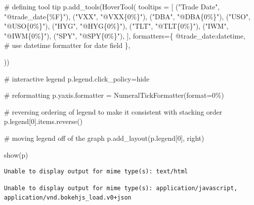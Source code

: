 \documentclass[
  letterpaper,
  DIV=11,
  numbers=noendperiod]{scrreprt}
\newenvironment{Shaded}{\begin{snugshade}}{\end{snugshade}}
\newcommand{\BuiltInTok}[1]{\textcolor[rgb]{0.00,0.23,0.31}{#1}}
\newcommand{\CommentTok}[1]{\textcolor[rgb]{0.37,0.37,0.37}{#1}}
\newcommand{\DecValTok}[1]{\textcolor[rgb]{0.68,0.00,0.00}{#1}}
\newcommand{\NormalTok}[1]{\textcolor[rgb]{0.00,0.23,0.31}{#1}}
\newcommand{\OperatorTok}[1]{\textcolor[rgb]{0.37,0.37,0.37}{#1}}
\newcommand{\SpecialCharTok}[1]{\textcolor[rgb]{0.37,0.37,0.37}{#1}}
\newcommand{\StringTok}[1]{\textcolor[rgb]{0.13,0.47,0.30}{#1}}
\begin{document}
\begin{Shaded}
\begin{Highlighting}[]
\CommentTok{\# defining tool tip}
\NormalTok{p.add\_tools(HoverTool(}
\NormalTok{    tooltips }\OperatorTok{=}\NormalTok{ [}
\NormalTok{        (}\StringTok{"Trade Date"}\NormalTok{, }\StringTok{"@trade\_date\{}\SpecialCharTok{\%F}\StringTok{\}"}\NormalTok{),}
\NormalTok{        (}\StringTok{"VXX"}\NormalTok{, }\StringTok{"@VXX\{0\%\}"}\NormalTok{),}
\NormalTok{        (}\StringTok{"DBA"}\NormalTok{, }\StringTok{"@DBA\{0\%\}"}\NormalTok{),}
\NormalTok{        (}\StringTok{"USO"}\NormalTok{, }\StringTok{"@USO\{0\%\}"}\NormalTok{),}
\NormalTok{        (}\StringTok{"HYG"}\NormalTok{, }\StringTok{"@HYG\{0\%\}"}\NormalTok{),}
\NormalTok{        (}\StringTok{"TLT"}\NormalTok{, }\StringTok{"@TLT\{0\%\}"}\NormalTok{),}
\NormalTok{        (}\StringTok{"IWM"}\NormalTok{, }\StringTok{"@IWM\{0\%\}"}\NormalTok{),}
\NormalTok{        (}\StringTok{"SPY"}\NormalTok{, }\StringTok{"@SPY\{0\%\}"}\NormalTok{),}
\NormalTok{    ],}
\NormalTok{    formatters}\OperatorTok{=}\NormalTok{\{}
        \StringTok{\textquotesingle{}@trade\_date\textquotesingle{}}\NormalTok{:}\StringTok{\textquotesingle{}datetime\textquotesingle{}}\NormalTok{, }\CommentTok{\# use \textquotesingle{}datetime\textquotesingle{} formatter for \textquotesingle{}date\textquotesingle{} field}
\NormalTok{    \},}

\NormalTok{))}

\CommentTok{\# interactive legend}
\NormalTok{p.legend.click\_policy}\OperatorTok{=}\StringTok{\textquotesingle{}hide\textquotesingle{}}

\CommentTok{\# reformatting }
\NormalTok{p.yaxis.formatter }\OperatorTok{=}\NormalTok{ NumeralTickFormatter(}\BuiltInTok{format}\OperatorTok{=}\StringTok{\textquotesingle{}0\%\textquotesingle{}}\NormalTok{)}

\CommentTok{\# reversing ordering of legend to make it consistent with stacking order}
\NormalTok{p.legend[}\DecValTok{0}\NormalTok{].items.reverse()}

\CommentTok{\# moving legend off of the graph}
\NormalTok{p.add\_layout(p.legend[}\DecValTok{0}\NormalTok{], }\StringTok{\textquotesingle{}right\textquotesingle{}}\NormalTok{)}

\NormalTok{show(p)}
\end{Highlighting}
\end{Shaded}

\begin{verbatim}
Unable to display output for mime type(s): text/html
\end{verbatim}

\begin{verbatim}
Unable to display output for mime type(s): application/javascript, application/vnd.bokehjs_load.v0+json
\end{verbatim}
\end{document}

